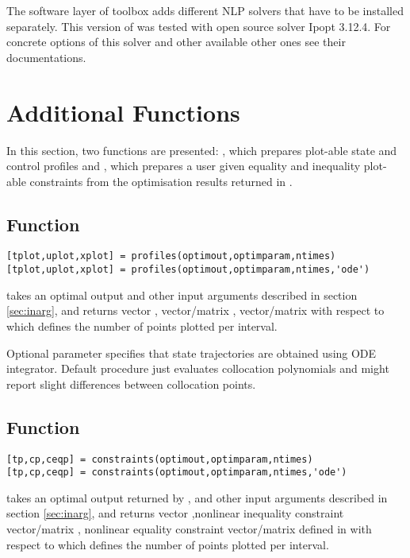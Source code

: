 The software layer of  toolbox adds different NLP solvers
that have to be installed separately. This version of  was
tested with open source solver Ipopt 3.12.4. For concrete options
of this solver and other available other ones see their
documentations.

\section{Additional Functions}
\label{sec:addfun}

In this section, two functions are presented: , which
prepares plot-able state and control profiles and ,
which prepares a user given equality and inequality plot-able
constraints from the optimisation results returned in
.

\subsection{Function~}
\label{sec:profiles}

\begin{verbatim}
[tplot,uplot,xplot] = profiles(optimout,optimparam,ntimes)
[tplot,uplot,xplot] = profiles(optimout,optimparam,ntimes,'ode')
\end{verbatim}
takes an optimal output  and other input arguments
 described in section \ref{sec:inarg}, and returns
vector , vector/matrix , vector/matrix
 with respect to  which defines the
number of points plotted per interval.

Optional parameter  specifies that state trajectories are
obtained using ODE integrator. Default procedure just evaluates
collocation polynomials and might report slight differences between
collocation points.

\subsection{Function~}
\label{sec:constraints}

\begin{verbatim}
[tp,cp,ceqp] = constraints(optimout,optimparam,ntimes)
[tp,cp,ceqp] = constraints(optimout,optimparam,ntimes,'ode')
\end{verbatim}
takes an optimal output  returned by , and
other input arguments  described in section
\ref{sec:inarg}, and returns vector ,nonlinear inequality 
constraint vector/matrix , nonlinear equality constraint
vector/matrix  defined in  with respect to
 which defines the number of points plotted per interval.

